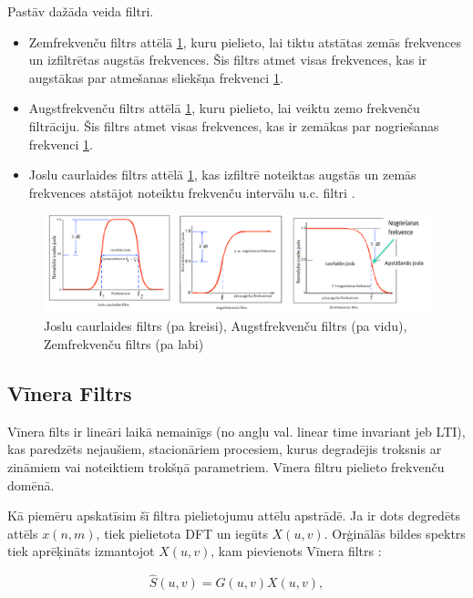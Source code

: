 \documentclass[12pt,paper=A4]{report}
\begin{document}
Pastāv dažāda veida filtri.
\begin{itemize}

\item Zemfrekvenču filtrs attēlā \ref{filtr}, kuru pielieto, lai tiktu atstātas zemās frekvences un izfiltrētas augstās frekvences. Šis filtrs atmet visas frekvences, kas ir augstākas par atmešanas sliekšņa frekvenci \ref{filtr}.  

\item Augstfrekvenču filtrs attēlā \ref{filtr}, kuru pielieto, lai veiktu zemo frekvenču filtrāciju. Šis filtrs atmet visas frekvences, kas ir zemākas par nogriešanas frekvenci \ref{filtr}. 

\item Joslu caurlaides filtrs attēlā \ref{filtr}, kas izfiltrē noteiktas augstās un zemās frekvences atstājot noteiktu frekvenču intervālu u.c. filtri \cite{http://www.swarthmore.edu/NatSci/echeeve1/Ref/DataSheet/IntroToFilters.pdf}. 

\end{itemize}
\begin{figure}[H] \centering
\includegraphics[width=1.02\textwidth]{bandPassFilter} 
\caption{ Joslu caurlaides filtrs (pa kreisi), Augstfrekvenču filtrs (pa vidu), Zemfrekvenču filtrs (pa labi) \cite{dtw6}}  \label{filtr} 
\end{figure}


\subsection{Vīnera Filtrs} 
Vīnera filts ir lineāri laikā nemainīgs (no angļu val. linear time invariant jeb LTI), kas paredzēts nejaušiem, stacionāriem procesiem, kurus degradējis troksnis ar zināmiem vai noteiktiem trokšņā parametriem. Vīnera filtru pielieto frekvenču domēnā. 

Kā piemēru apskatīsim šī filtra pielietojumu attēlu apstrādē.
Ja ir dots degredēts attēls $x(n,m)$, tiek pielietota 
DFT un iegūts $X(u,v)$. Orģinālās bildes spektrs tiek aprēķināts
izmantojot $X(u,v)$, kam pievienots Vīnera filtrs \cite{dtw45}:

\begin{equation}
\hat{S}(u,v) = G(u,v)X(u,v),
\end{equation}
\end{document}
